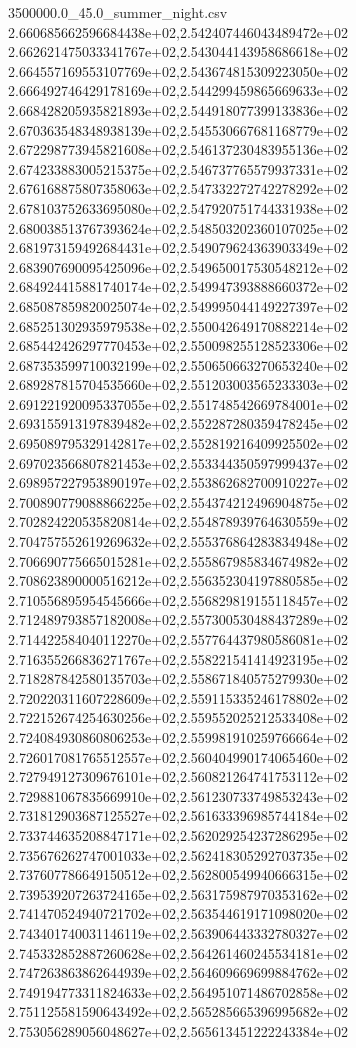 \begin{filecontents*}{3500000.0_45.0_summer_night.csv}
2.660685662596684438e+02,2.542407446043489472e+02
2.662621475033341767e+02,2.543044143958686618e+02
2.664557169553107769e+02,2.543674815309223050e+02
2.666492746429178169e+02,2.544299459865669633e+02
2.668428205935821893e+02,2.544918077399133836e+02
2.670363548348938139e+02,2.545530667681168779e+02
2.672298773945821608e+02,2.546137230483955136e+02
2.674233883005215375e+02,2.546737765579937331e+02
2.676168875807358063e+02,2.547332272742278292e+02
2.678103752633695080e+02,2.547920751744331938e+02
2.680038513767393624e+02,2.548503202360107025e+02
2.681973159492684431e+02,2.549079624363903349e+02
2.683907690095425096e+02,2.549650017530548212e+02
2.684924415881740174e+02,2.549947393888660372e+02
2.685087859820025074e+02,2.549995044149227397e+02
2.685251302935979538e+02,2.550042649170882214e+02
2.685442426297770453e+02,2.550098255128523306e+02
2.687353599710032199e+02,2.550650663270653240e+02
2.689287815704535660e+02,2.551203003565233303e+02
2.691221920095337055e+02,2.551748542669784001e+02
2.693155913197839482e+02,2.552287280359478245e+02
2.695089795329142817e+02,2.552819216409925502e+02
2.697023566807821453e+02,2.553344350597999437e+02
2.698957227953890197e+02,2.553862682700910227e+02
2.700890779088866225e+02,2.554374212496904875e+02
2.702824220535820814e+02,2.554878939764630559e+02
2.704757552619269632e+02,2.555376864283834948e+02
2.706690775665015281e+02,2.555867985834674982e+02
2.708623890000516212e+02,2.556352304197880585e+02
2.710556895954545666e+02,2.556829819155118457e+02
2.712489793857182008e+02,2.557300530488437289e+02
2.714422584040112270e+02,2.557764437980586081e+02
2.716355266836271767e+02,2.558221541414923195e+02
2.718287842580135703e+02,2.558671840575279930e+02
2.720220311607228609e+02,2.559115335246178802e+02
2.722152674254630256e+02,2.559552025212533408e+02
2.724084930860806253e+02,2.559981910259766664e+02
2.726017081765512557e+02,2.560404990174065460e+02
2.727949127309676101e+02,2.560821264741753112e+02
2.729881067835669910e+02,2.561230733749853243e+02
2.731812903687125527e+02,2.561633396985744184e+02
2.733744635208847171e+02,2.562029254237286295e+02
2.735676262747001033e+02,2.562418305292703735e+02
2.737607786649150512e+02,2.562800549940666315e+02
2.739539207263724165e+02,2.563175987970353162e+02
2.741470524940721702e+02,2.563544619171098020e+02
2.743401740031146119e+02,2.563906443332780327e+02
2.745332852887260628e+02,2.564261460245534181e+02
2.747263863862644939e+02,2.564609669699884762e+02
2.749194773311824633e+02,2.564951071486702858e+02
2.751125581590643492e+02,2.565285665396995682e+02
2.753056289056048627e+02,2.565613451222243384e+02

\end{filecontents*}
